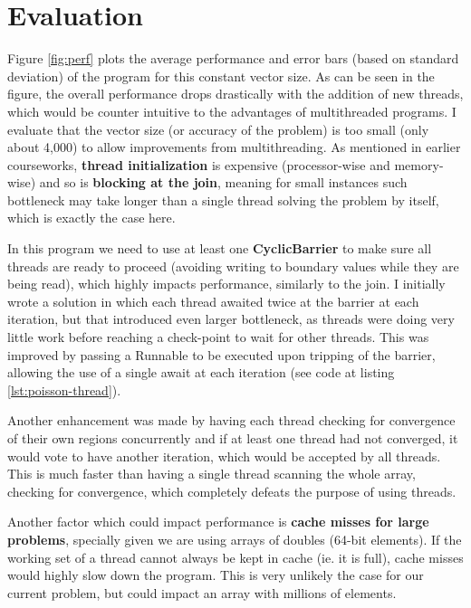 \documentclass{article}
\begin{document}
\section{Evaluation}

Figure \ref{fig:perf} plots the average performance and error bars (based on standard deviation) of the program for this constant vector size. As can be seen in the figure, the overall performance drops drastically with the addition of new threads, which would be counter intuitive to the advantages of multithreaded programs. I evaluate that the vector size (or accuracy of the problem) is too small (only about 4,000) to allow improvements from multithreading. As mentioned in earlier courseworks, \textbf{thread initialization} is expensive (processor-wise and memory-wise) and so is \textbf{blocking at the join}, meaning for small instances such bottleneck may take longer than a single thread solving the problem by itself, which is exactly the case here.

In this program we need to use at least one \textbf{CyclicBarrier} to make sure all threads are ready to proceed (avoiding writing to boundary values while they are being read), which highly impacts performance, similarly to the join. I initially wrote a solution in which each thread awaited twice at the barrier at each iteration, but that introduced even larger bottleneck, as threads were doing very little work before reaching a check-point to wait for other threads. This was improved by passing a Runnable to be executed upon tripping of the barrier, allowing the use of a single await at each iteration (see code at listing \ref{lst:poisson-thread}).  

Another enhancement was made by having each thread checking for convergence of their own regions concurrently and if at least one thread had not converged, it would vote to have another iteration, which would be accepted by all threads. This is much faster than having a single thread scanning the whole array, checking for convergence, which completely defeats the purpose of using threads.

Another factor which could impact performance is \textbf{cache misses for large problems}, specially given we are using arrays of doubles (64-bit elements). If the working set of a thread cannot always be kept in cache (ie. it is full), cache misses would highly slow down the program. This is very unlikely the case for our current problem, but could impact an array with millions of elements.
\end{document}
